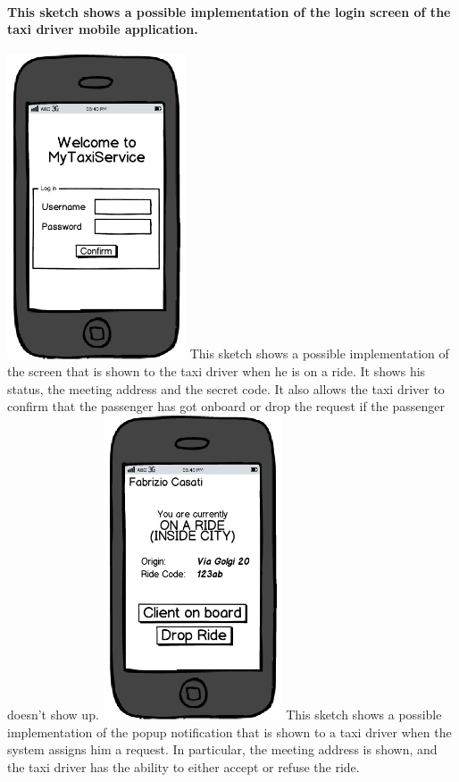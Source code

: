 \begin{center}
\paragraph{This sketch shows a possible implementation of the login screen of the taxi driver mobile application.}
\includegraphics[width=150pt,keepaspectratio]{images/taxi_login.png}
{This sketch shows a possible implementation of the screen that is shown to the taxi driver when he is on a ride. It shows his status, the meeting address and the secret code. It also allows the taxi driver to confirm that the passenger has got onboard or drop the request if the passenger doesn’t show up.}
\includegraphics[width=150pt,keepaspectratio]{images/taxi_meeting.png}
{This sketch shows a possible implementation of the popup notification that is shown to a taxi driver when the system assigns him a request. In particular, the meeting address is shown, and the taxi driver has the ability to either accept or refuse the ride.}

\end{center}
